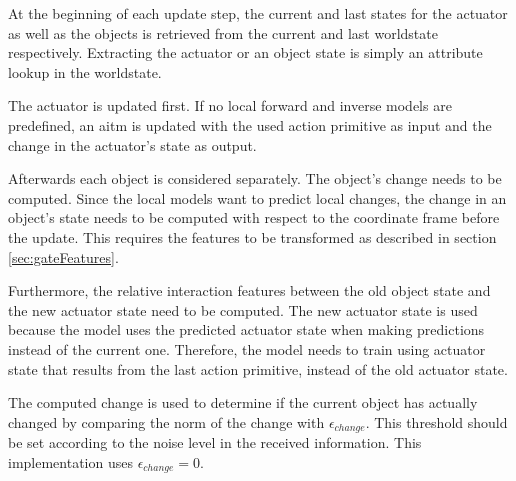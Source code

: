 %	

At the beginning of each update step, the current and last states for the actuator as well as the objects is retrieved from the current and last worldstate respectively.
Extracting the actuator or an object state is simply an attribute lookup in the worldstate. 

The actuator is updated first. If no local forward and inverse models are predefined, an \gls{aitm} is updated with the used action primitive as input and the change in the actuator's state as output.

Afterwards each object is considered separately. The object's change needs to be computed. Since the local models want to predict local changes, the change in an object's state needs to be computed with respect to the coordinate frame before the update. This requires the features to be transformed as described in section \ref{sec:gateFeatures}.

Furthermore, the relative interaction features between the old object state and the new actuator state need to be computed. The new actuator state is used because the model uses the predicted actuator state when making predictions instead of the current one. Therefore, the model needs to train using actuator state that results from the last action primitive, instead of the old actuator state.

The computed change is used to determine if the current object has actually changed by comparing the norm of the change with $\epsilon_{change}$. This threshold should be set according to the noise level in the received information. This implementation uses $\epsilon_{change} = 0$.

